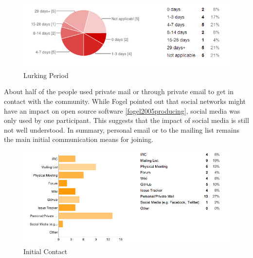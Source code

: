 \begin{figure}[ht!]
\centering
\includegraphics[width=120mm]{chapters/img/lurking_response.png}
\caption{Lurking Period}
\label{fig:lurking_period}
\end{figure}

About half of the people used private mail or through private email to get in contact with the community. While Fogel pointed out that social networks might have an impact on open source software \ref{fogel2005producing}, social media was only used by one participant. This suggests that the impact of social media is still not well understood. In summary, personal email or to the mailing list remains the main initial communication means for joining.

\begin{figure}[ht!]
\centering
\includegraphics[width=120mm]{chapters/img/initial_contact.png}
\caption{Initial Contact}
\label{fig:initial_contact}
\end{figure}